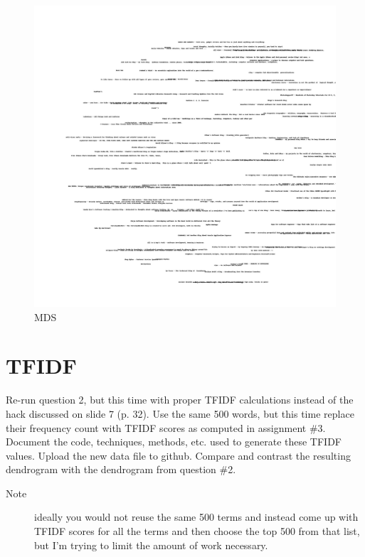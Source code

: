 \documentclass[paper=a4, fontsize=11pt]{scrartcl} %
\numberwithin{equation}{section} %
\numberwithin{figure}{section} %
\numberwithin{table}{section} %
\begin{document}
\begin{figure}[H]
\includegraphics[width=1.2\textwidth]{output/blogs2d}
\caption{MDS}
\label{fig:mds}
\end{figure}

\newpage
\section{TFIDF}
Re-run question 2, but this time with proper TFIDF calculations instead of the hack discussed on slide 7 (p. 32).  
Use the same 500 words, but this time replace their frequency count with TFIDF scores as computed in assignment \#3.  
Document the code, techniques, methods, etc. used to generate these TFIDF values.  
Upload the new data file to github.
Compare and contrast the resulting dendrogram with the dendrogram
from question \#2.
\begin{description}
 \item[Note] ideally you would not reuse the same 500 terms and instead come up with TFIDF scores for all the terms and then choose the top 500 from that list, but I'm trying to limit the amount of work necessary.
\end{description}
\end{document}
